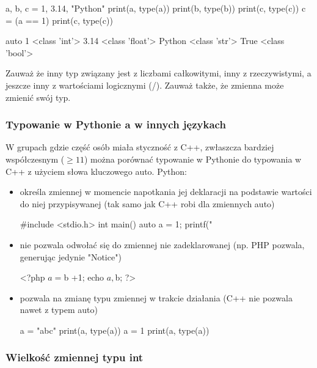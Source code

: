 \documentclass{pdfBooklets}
\begin{document}
\begin{CodeFrame}[python]{0.50\textwidth}
a, b, c = 1, 3.14, "Python"
print(a, type(a))
print(b, type(b))
print(c, type(c))
c = (a == 1)
print(c, type(c))
\end{CodeFrame}
\begin{CodeFrame}{auto}
1 <class 'int'>
3.14 <class 'float'>
Python <class 'str'>
True <class 'bool'>
\end{CodeFrame}

Zauważ że inny typ związany jest z liczbami całkowitymi, inny z rzeczywistymi, a jeszcze inny z wartościami logicznymi (/). Zauważ także, że zmienna może zmienić swój typ.

\begin{teacherOnly}
\subsubsection{Typowanie w Pythonie a w innych językach {\Symbola 🤔}}
W grupach gdzie część osób miała styczność z C++, zwłaszcza bardziej współczesnym ($\ge 11$) można porównać typowanie w Pythonie do typowania w C++ z użyciem słowa kluczowego auto. Python:
\begin{itemize}
\item określa zmiennej w momencie napotkania jej deklaracji na podstawie wartości do niej przypisywanej (tak samo jak C++ robi dla zmiennych auto)
\begin{CodeFrame*}[cpp]{}
#include <stdio.h>
int main() {
  auto a = 1;
  printf("%
}
\end{CodeFrame*}
\item nie pozwala odwołać się do zmiennej nie zadeklarowanej (np. PHP pozwala, generując jedynie "Notice")
\begin{CodeFrame*}[php]{}
<?php
$a = $b +1;
echo $a, $b;
?>
\end{CodeFrame*}
\item pozwala na zmianę typu zmiennej w trakcie działania (C++ nie pozwala nawet z typem auto)
\begin{CodeFrame*}[python]{}
a = "abc"
print(a, type(a))
a = 1
print(a, type(a))
\end{CodeFrame*}
\end{itemize}

\subsubsection{Wielkość zmiennej typu int {\Symbola 🤔}}


\end{teacherOnly}
\end{document}
